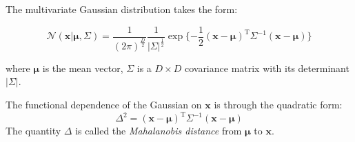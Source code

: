 The multivariate Gaussian distribution takes the form:
\begin{definition}
\begin{equation}
\mathcal{N}(\mathbf{x}\vert\boldsymbol{\mu{}},\Sigma)=\frac{1}{(2\pi)^{\frac{D}{2}}}\frac{1}{\vert\Sigma\vert^{\frac{1}{2}}}\exp{}\{-\frac{1}{2}(\mathbf{x}-\boldsymbol{\mu})^{\mathrm{T}}\Sigma^{-1}(\mathbf{x}-\boldsymbol{\mu})\}
\label{eqn:defgaussian}
\end{equation}
\end{definition}
where $\boldsymbol{\mu{}}$ is the mean vector, $\Sigma$ is a $D\times{}D$
covariance matrix with its determinant $\vert{}\Sigma\vert$.


The functional dependence of the Gaussian on $\mathbf{x}$ is through
the quadratic form:
\begin{equation}
\Delta^2=(\mathbf{x}-\boldsymbol{\mu})^{\mathrm{T}}\Sigma^{-1}(\mathbf{x}-\boldsymbol{\mu})
\label{eqn:mahalanobis}
\end{equation}
The quantity $\Delta$ is called the \emph{Mahalanobis distance} from
$\boldsymbol{\mu}$ to $\mathbf{x}$.


